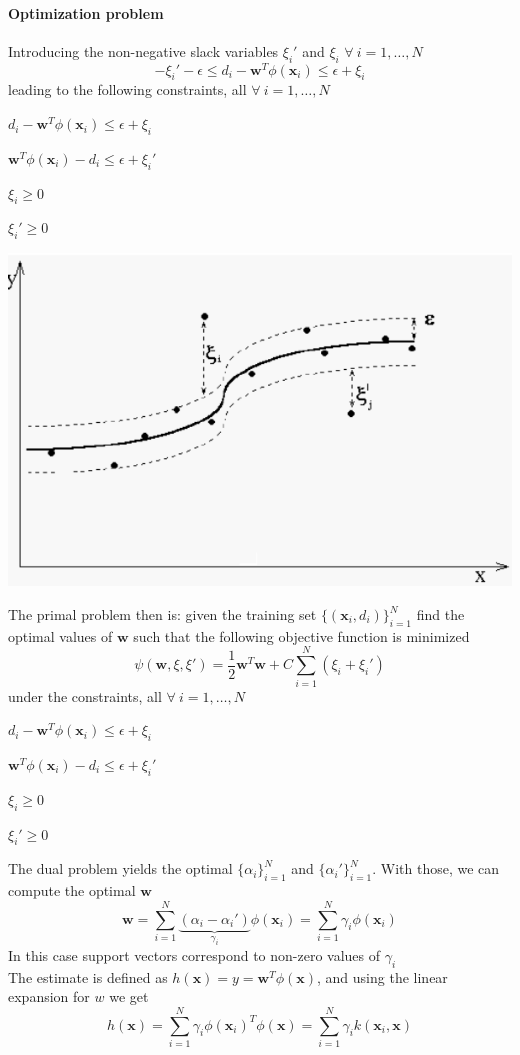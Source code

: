 \documentclass[10pt]{report}
\begin{document}
\paragraph{Optimization problem} Introducing the non-negative slack variables $\xi_i'$ and $\xi_i$ $\forall\:i=1,\ldots,N$ $$-\xi_i'-\epsilon \leq d_i-\mathbf{w}^T\phi(\mathbf{x}_i)\leq \epsilon + \xi_i$$
leading to the following constraints, all $\forall\:i=1,\ldots,N$
\begin{list}{}{}
	\item $d_i - \mathbf{w}^T\phi(\mathbf{x}_i)\leq \epsilon + \xi_i$
	\item $\mathbf{w}^T\phi(\mathbf{x}_i)-d_i\leq \epsilon + \xi_i'$
	\item $\xi_i\geq 0$
	\item $\xi_i'\geq 0$
\end{list}
\begin{center}
	\includegraphics[scale=0.5]{53.png}
\end{center}
The primal problem then is: given the training set $\{(\mathbf{x}_i, d_i)\}_{i=1}^N$ find the optimal values of $\mathbf{w}$ such that the following objective function is minimized $$\psi(\mathbf{w},\xi,\xi') = \frac{1}{2}\mathbf{w}^T\mathbf{w} + C\sum_{i=1}^N\left(\xi_i+\xi_i'\right)$$ under the constraints, all $\forall\:i=1,\ldots,N$
\begin{list}{}{}
	\item $d_i - \mathbf{w}^T\phi(\mathbf{x}_i)\leq \epsilon + \xi_i$
	\item $\mathbf{w}^T\phi(\mathbf{x}_i)-d_i\leq \epsilon + \xi_i'$
	\item $\xi_i\geq 0$
	\item $\xi_i'\geq 0$
\end{list}
The dual problem yields the optimal $\{\alpha_i\}_{i=1}^N$ and $\{\alpha_i'\}_{i=1}^N$. With those, we can compute the optimal $\mathbf{w}$ $$\mathbf{w}=\sum_{i=1}^N\underset{\gamma_i}{\underbrace{(\alpha_i - \alpha_i')}}\phi(\mathbf{x}_i) = \sum_{i=1}^N\gamma_i\phi(\mathbf{x}_i)$$
In this case support vectors correspond to non-zero values of $\gamma_i$\\
The estimate is defined as $h(\mathbf{x}) = y = \mathbf{w}^T\phi(\mathbf{x})$, and using the linear expansion for $w$ we get $$h(\mathbf{x}) = \sum_{i=1}^N\gamma_i\phi(\mathbf{x}_i)^T\phi(\mathbf{x}) = \sum_{i=1}^N\gamma_i k(\mathbf{x}_i, \mathbf{x})$$
\end{document}
